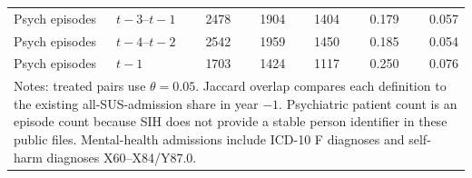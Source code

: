 \begin{table}[!htbp]
{\begin{tabular}{llrrrrr}
Psych episodes & $t-3$--$t-1$ & 2478 & 1904 & 1404 & 0.179 & 0.057 \\
Psych episodes & $t-4$--$t-2$ & 2542 & 1959 & 1450 & 0.185 & 0.054 \\
Psych episodes & $t-1$ & 1703 & 1424 & 1117 & 0.250 & 0.076 \\
\bottomrule
\multicolumn{7}{p{0.9\textwidth}}{\footnotesize Notes: treated pairs use $\theta=0.05$. Jaccard overlap compares each definition to the existing all-SUS-admission share in year $-1$. Psychiatric patient count is an episode count because SIH does not provide a stable person identifier in these public files. Mental-health admissions include ICD-10 F diagnoses and self-harm diagnoses X60--X84/Y87.0.}\\
\end{tabular}
}%
\end{table}
